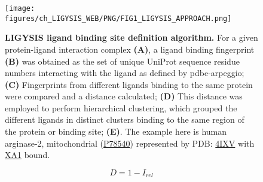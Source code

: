 \begin{figure}[htb!]
    \centering
    \texttt{[image: figures/ch\_LIGYSIS\_WEB/PNG/FIG1\_LIGYSIS\_APPROACH.png]}
    \caption[LIGYSIS ligand binding site definition algorithm]{\textbf{LIGYSIS ligand binding site definition algorithm.} For a given protein-ligand interaction complex \textbf{(A)}, a ligand binding fingerprint \textbf{(B)} was obtained as the set of unique UniProt sequence residue numbers interacting with the ligand as defined by pdbe-arpeggio; \textbf{(C)} Fingerprints from different ligands binding to the same protein were compared and a distance calculated; \textbf{(D)} This distance was employed to perform hierarchical clustering, which grouped the different ligands in distinct clusters binding to the same region of the protein or binding site; \textbf{(E)}. The example here is human arginase-2, mitochondrial (\href{https://www.uniprot.org/uniprotkb/P78540/entry}{P78540}) represented by PDB: \href{https://www.ebi.ac.uk/pdbe/entry/pdb/4ixv}{4IXV} \cite{GOLEBIOWSKI_2013_ARGINASE} with \href{https://www.ebi.ac.uk/pdbe-srv/pdbechem/chemicalCompound/show/XA1}{XA1} bound.}
    \label{fig:LIGYSIS_method}
\end{figure}

\vspace{-12pt} %
\vspace{-12pt} %

\begin{equation}
D = 1 - I_{rel}
\label{eq:Irel_distance}
\end{equation}

\vspace{-12pt} %


